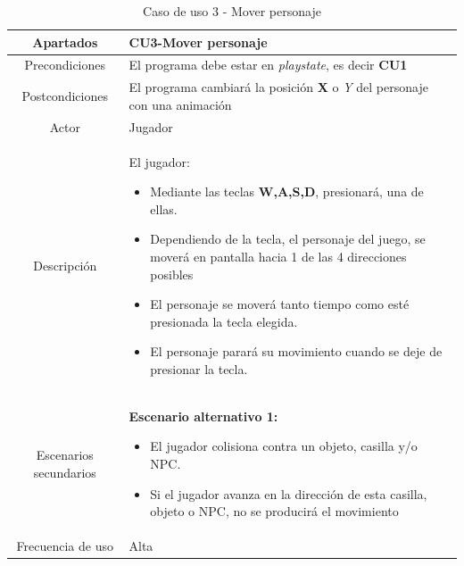 \documentclass[a4paper]{article}
\begin{document}
\begin{table}[!ht]
    \centering
    \begin{tabular}{|c|p{12cm}|}
        \hline
        \textbf{Apartados}     & \textbf{CU3-Mover personaje}                                                                 \\
        \hline
        Precondiciones         & El programa debe estar en \textit{playstate}, es decir \textbf{CU1}                          \\
        \hline
        Postcondiciones        & El programa cambiará la posición \textbf{X} o \textit{Y} del personaje con una animación     \\
        \hline
        Actor                  & Jugador                                                                                      \\
        \hline
        Descripción            & El jugador:
        \begin{itemize}
            \item Mediante las teclas \textbf{W,A,S,D}, presionará, una de ellas.
            \item Dependiendo de la tecla, el personaje del juego, se moverá en pantalla hacia 1 de las 4 direcciones posibles
            \item El personaje se moverá tanto tiempo como esté presionada la tecla elegida.
            \item El personaje parará su movimiento cuando se deje de presionar la tecla.
        \end{itemize}     \\
        \hline
        Escenarios secundarios & \textbf{Escenario alternativo 1:}
        \begin{itemize}
            \item El jugador colisiona contra un objeto, casilla y/o NPC.
            \item[\faAngleRight] Si el jugador avanza en la dirección de esta casilla, objeto o NPC, no se producirá el movimiento
        \end{itemize} \\
        \hline
        Frecuencia de uso      & Alta                                                                                         \\
        \hline
    \end{tabular}
    \caption{Caso de uso 3 - Mover personaje}
    \label{tab:casosdeuso3-table}
\end{table}
\end{document}
